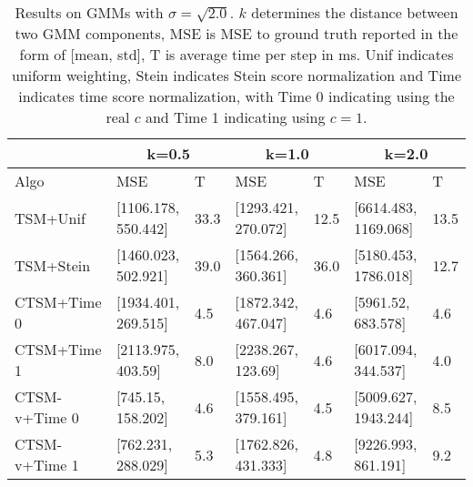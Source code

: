 \begin{table*}
        \begin{center}
        \caption{Results on GMMs with $\sigma=\sqrt{2.0}$. $k$ determines the distance between two GMM components, MSE is MSE to ground truth reported in the form of [mean, std], T is average time per step in ms. Unif indicates uniform weighting, Stein indicates Stein score normalization and Time indicates time score normalization, with Time 0 indicating using the real $c$ and Time 1 indicating using $c=1$.}
                \begin{tabular}{|l|l|l|l|l|l|l|}
                        \hline
                        & \multicolumn{2}{|c|}{k=0.5} & \multicolumn{2}{|c|}{k=1.0} & \multicolumn{2}{|c|}{k=2.0} \\
                        \hline
                        Algo & MSE & T & MSE & T & MSE & T \\
                        \hline
                        TSM+Unif & [1106.178, 550.442] & 33.3 & [1293.421, 270.072] & 12.5 & [6614.483, 1169.068] & 13.5 \\
                        \hline
                        TSM+Stein & [1460.023, 502.921] & 39.0 & [1564.266, 360.361] & 36.0 & [5180.453, 1786.018] & 12.7 \\
                        \hline
                        CTSM+Time 0 & [1934.401, 269.515] & 4.5 & [1872.342, 467.047] & 4.6 & [5961.52, 683.578] & 4.6 \\
                        \hline
                        CTSM+Time 1 & [2113.975, 403.59] & 8.0 & [2238.267, 123.69] & 4.6 & [6017.094, 344.537] & 4.0 \\
                        \hline
                        CTSM-v+Time 0 & [745.15, 158.202] & 4.6 & [1558.495, 379.161] & 4.5 & [5009.627, 1943.244] & 8.5 \\
                        \hline
                        CTSM-v+Time 1 & [762.231, 288.029] & 5.3 & [1762.826, 431.333] & 4.8 & [9226.993, 861.191] & 9.2 \\
                        \hline
                \end{tabular}
        \label{tbl:gmms-2.0}
        \end{center}
\end{table*}

